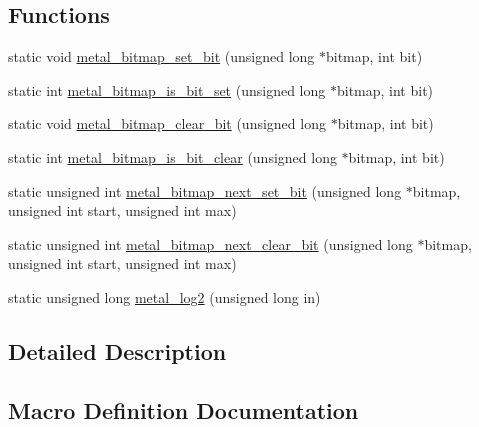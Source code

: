 \subsection*{Functions}
\begin{DoxyCompactItemize}
\item 
static void \hyperlink{group__utilities_ga622ee22edc3b4788268dc828f9b5420a}{metal\+\_\+bitmap\+\_\+set\+\_\+bit} (unsigned long $\ast$bitmap, int bit)
\item 
static int \hyperlink{group__utilities_ga94c36e928910f02111963daa47cad587}{metal\+\_\+bitmap\+\_\+is\+\_\+bit\+\_\+set} (unsigned long $\ast$bitmap, int bit)
\item 
static void \hyperlink{group__utilities_gabee027a937a66b1d8b9f05305edb9f30}{metal\+\_\+bitmap\+\_\+clear\+\_\+bit} (unsigned long $\ast$bitmap, int bit)
\item 
static int \hyperlink{group__utilities_gaf87fdcddbe6c2daa61f24da064215312}{metal\+\_\+bitmap\+\_\+is\+\_\+bit\+\_\+clear} (unsigned long $\ast$bitmap, int bit)
\item 
static unsigned int \hyperlink{group__utilities_gad10cd8f0c0300e70f9bba357dbee6c77}{metal\+\_\+bitmap\+\_\+next\+\_\+set\+\_\+bit} (unsigned long $\ast$bitmap, unsigned int start, unsigned int max)
\item 
static unsigned int \hyperlink{group__utilities_gadc1fed2eca21c2c0435feca5a734f816}{metal\+\_\+bitmap\+\_\+next\+\_\+clear\+\_\+bit} (unsigned long $\ast$bitmap, unsigned int start, unsigned int max)
\item 
static unsigned long \hyperlink{group__utilities_ga386baee8a2518eab0d2fc644f6634891}{metal\+\_\+log2} (unsigned long in)
\end{DoxyCompactItemize}


\subsection{Detailed Description}


\subsection{Macro Definition Documentation}
\mbox{\label{group__utilities_ga156203f45b1730445ff94ea22f619917}} 

